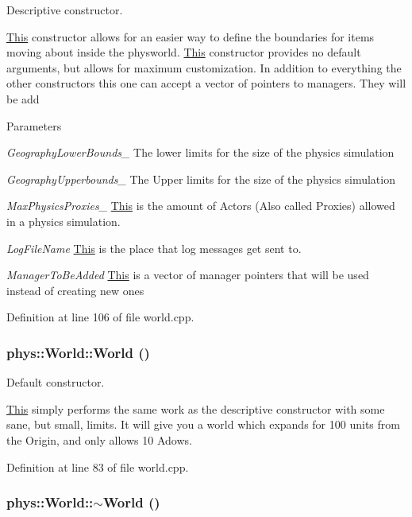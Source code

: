 Descriptive constructor. 

\hyperlink{structThis}{This} constructor allows for an easier way to define the boundaries for items moving about inside the physworld. \hyperlink{structThis}{This} constructor provides no default arguments, but allows for maximum customization. In addition to everything the other constructors this one can accept a vector of pointers to managers. They will be add 
\begin{DoxyParams}{Parameters}
\item[{\em GeographyLowerBounds\_\-}]The lower limits for the size of the physics simulation \item[{\em GeographyUpperbounds\_\-}]The Upper limits for the size of the physics simulation \item[{\em MaxPhysicsProxies\_\-}]\hyperlink{structThis}{This} is the amount of Actors (Also called Proxies) allowed in a physics simulation. \item[{\em LogFileName}]\hyperlink{structThis}{This} is the place that log messages get sent to. \item[{\em ManagerToBeAdded}]\hyperlink{structThis}{This} is a vector of manager pointers that will be used instead of creating new ones \end{DoxyParams}


Definition at line 106 of file world.cpp.

\hypertarget{classphys_1_1World_a7f762724406c874250c3dc8910a1e695}{
\subsubsection[{World}]{\setlength{\rightskip}{0pt plus 5cm}phys::World::World ()}}
\label{da/ddf/classphys_1_1World_a7f762724406c874250c3dc8910a1e695}


Default constructor. 

\hyperlink{structThis}{This} simply performs the same work as the descriptive constructor with some sane, but small, limits. It will give you a world which expands for 100 units from the Origin, and only allows 10 Adows. 

Definition at line 83 of file world.cpp.

\hypertarget{classphys_1_1World_a8b2c74c7e5d5ce3c46a814e183a7aff1}{
\subsubsection[{$\sim$World}]{\setlength{\rightskip}{0pt plus 5cm}phys::World::$\sim$World ()}}
\label{da/ddf/classphys_1_1World_a8b2c74c7e5d5ce3c46a814e183a7aff1}



